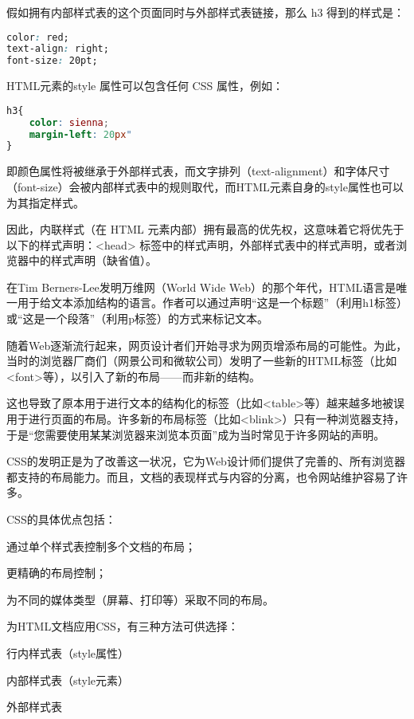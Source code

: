 假如拥有内部样式表的这个页面同时与外部样式表链接，那么 h3 得到的样式是：

\begin{lstlisting}[language=CSS]
color: red; 
text-align: right; 
font-size: 20pt;
\end{lstlisting}

HTML元素的style 属性可以包含任何 CSS 属性，例如：

\begin{lstlisting}[language=CSS]
h3{
	color: sienna; 
	margin-left: 20px"
}
\end{lstlisting}

即颜色属性将被继承于外部样式表，而文字排列（text-alignment）和字体尺寸（font-size）会被内部样式表中的规则取代，而HTML元素自身的style属性也可以为其指定样式。

因此，内联样式（在 HTML 元素内部）拥有最高的优先权，这意味着它将优先于以下的样式声明：<head> 标签中的样式声明，外部样式表中的样式声明，或者浏览器中的样式声明（缺省值）。




在Tim Berners-Lee发明万维网（World Wide Web）的那个年代，HTML语言是唯一用于给文本添加结构的语言。作者可以通过声明“这是一个标题”（利用h1标签）或“这是一个段落”（利用p标签）的方式来标记文本。

随着Web逐渐流行起来，网页设计者们开始寻求为网页增添布局的可能性。为此，当时的浏览器厂商们（网景公司和微软公司）发明了一些新的HTML标签（比如<font>等），以引入了新的布局——而非新的结构。

这也导致了原本用于进行文本的结构化的标签（比如<table>等）越来越多地被误用于进行页面的布局。许多新的布局标签（比如<blink>）只有一种浏览器支持，于是“您需要使用某某浏览器来浏览本页面”成为当时常见于许多网站的声明。

CSS的发明正是为了改善这一状况，它为Web设计师们提供了完善的、所有浏览器都支持的布局能力。而且，文档的表现样式与内容的分离，也令网站维护容易了许多。

CSS的具体优点包括：

\begin{compactitem}
\item 通过单个样式表控制多个文档的布局；
\item 更精确的布局控制；
\item 为不同的媒体类型（屏幕、打印等）采取不同的布局。
\end{compactitem}


为HTML文档应用CSS，有三种方法可供选择：

\begin{compactenum}
\item 行内样式表（style属性）
\item 内部样式表（style元素）
\item 外部样式表
\end{compactenum}


